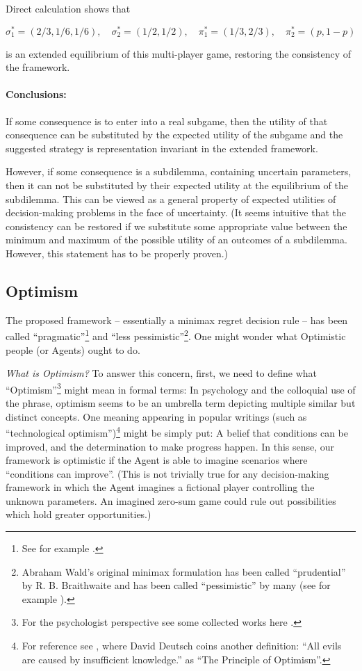 \documentclass{article}
\begin{document}
Direct calculation shows that

\[
\sigma_1^*=(2/3,1/6,1/6), \quad
\sigma_2^*=(1/2,1/2), \quad
\pi_1^*=(1/3,2/3), \quad
\pi_2^*=(p,1-p)
\]

is an extended equilibrium of this multi-player game, restoring the consistency of the framework.

\paragraph{Conclusions:}
If some consequence is to enter into a real subgame, then the utility of that consequence can be substituted by the expected utility of the subgame and
the suggested strategy is representation invariant in the extended framework.

However, if some consequence is a subdilemma, containing uncertain parameters, then it can not be substituted by their expected utility at the equilibrium of the subdilemma. This can be viewed as a general property of expected utilities of decision-making problems in the face of uncertainty.
(It seems intuitive that the consistency can be restored if we substitute some appropriate value between the minimum and maximum of the possible utility of an outcomes of a subdilemma. However, this statement has to be properly proven.)

\subsection*{Optimism}

The proposed framework -- essentially a minimax regret decision rule -- has been called ``pragmatic''\footnote{See for example \cite{paper:MinimaxRegretTreatment, web:minimaxregret_quickonomics}.} and  ``less pessimistic''\footnote{Abraham Wald's original minimax formulation \cite{book:Wald} has been called ``prudential'' by R. B. Braithwaite \cite{book:GoodThinking,book:ScientificExplanationBraithwaite} and has been called ``pessimistic'' by many (see for example \cite{book:ResnikDecisionTheory}).}. One might wonder what Optimistic people (or Agents) ought to do.

{\it What is Optimism?}
To answer this concern, first, we need to define what ``Optimism''\footnote{For the psychologist perspective see some collected works here \cite{book:OptimismPessimismPsychology}.} might mean in formal terms:
In psychology and the colloquial use of the phrase, optimism seems to be an umbrella term depicting multiple similar but distinct concepts.
One meaning appearing in popular writings (such as ``technological optimism'')\footnote{For reference see \cite{book:DeutschBeginningOfInfinity,web:DeutschOptimism}, where David Deutsch coins another definition: ``All evils are caused by insufficient knowledge.'' as ``The Principle of Optimism''.} might be simply put: A belief that conditions can be improved, and the determination to make progress happen.
In this sense, our framework is optimistic if the Agent is able to imagine scenarios where ``conditions can improve''. (This is not trivially true for any decision-making framework in which the Agent imagines a fictional player controlling the unknown parameters. An imagined zero-sum game could rule out possibilities which hold greater opportunities.)
\end{document}

